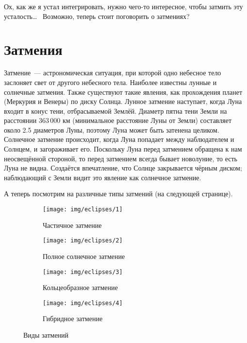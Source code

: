 \documentclass[12pt]{article}
\numberwithin{equation}{section} %
\theoremstyle{definition}\newtheorem{defi}{Определение}
\begin{document}
Ох, как же я устал интегрировать, нужно чего-то интересное, чтобы затмить эту усталость\dots~ Возможно, теперь стоит поговорить о затмениях?

\section{Затмения}

Затмение~--- астрономическая ситуация, при которой одно небесное тело заслоняет свет от другого небесного тела. Наиболее известны лунные и солнечные затмения. Также существуют такие явления, как прохождения планет (Меркурия и Венеры) по диску Солнца. Лунное затмение наступает, когда Луна входит в конус тени, отбрасываемой Землёй. Диаметр пятна тени Земли на расстоянии 363\,000 км (минимальное расстояние Луны от Земли) составляет около 2.5 диаметров Луны, поэтому Луна может быть затенена целиком. Солнечное затмение происходит, когда Луна попадает между наблюдателем и Солнцем, и загораживает его. Поскольку Луна перед затмением обращена к нам неосвещённой стороной, то перед затмением всегда бывает новолуние, то есть Луна не видна. Создаётся впечатление, что Солнце закрывается чёрным диском; наблюдающий с Земли видит это явление как солнечное затмение.

А теперь посмотрим на различные типы затмений (на следующей странице).

\newpage
\begin{figure}
  
  \begin{subfigure}[b]{0.45\textwidth}
    \texttt{[image: img/eclipses/1]}
    \caption{Частичное затмение}  
  \end{subfigure}
  \centering
  \begin{subfigure}[b]{0.45\textwidth}
    \texttt{[image: img/eclipses/2]}
    \caption{Полное солнечное затмение}  
  \end{subfigure}
  
  \begin{subfigure}[b]{0.45\textwidth}
    \texttt{[image: img/eclipses/3]}
    \caption{Кольцеобразное затмение}  
  \end{subfigure}
  \centering
  \begin{subfigure}[b]{0.45\textwidth}
    \texttt{[image: img/eclipses/4]}
    \caption{Гибридное затмение}  
  \end{subfigure}
  
  \caption{Виды затмений}
\end{figure}
\end{document}
